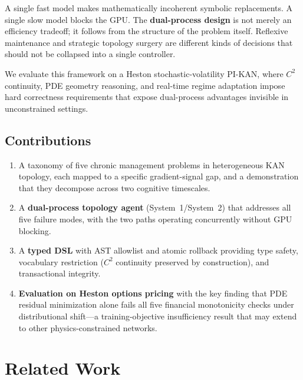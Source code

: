 \documentclass[11pt,a4paper]{article}
\begin{document}
A single fast model makes mathematically incoherent symbolic replacements. A single slow
model blocks the GPU. The \textbf{dual-process design} is not merely an efficiency
tradeoff; it follows from the structure of the problem itself. Reflexive maintenance and
strategic topology surgery are different kinds of decisions that should not be collapsed
into a single controller.

We evaluate this framework on a Heston stochastic-volatility PI-KAN, where $C^2$
continuity, PDE geometry reasoning, and real-time regime adaptation impose hard
correctness requirements that expose dual-process advantages invisible in unconstrained
settings.

\subsection{Contributions}

\begin{enumerate}[nosep]
  \item A taxonomy of five chronic management problems in heterogeneous KAN topology,
  each mapped to a specific gradient-signal gap, and a demonstration that they decompose
  across two cognitive timescales.

  \item A \textbf{dual-process topology agent} (System~1/System~2) that addresses all
  five failure modes, with the two paths operating concurrently without GPU blocking.

  \item A \textbf{typed DSL} with AST allowlist and atomic rollback providing type
  safety, vocabulary restriction ($C^2$ continuity preserved by construction), and
  transactional integrity.

  \item \textbf{Evaluation on Heston options pricing} with the key finding that PDE
  residual minimization alone fails all five financial monotonicity checks under
  distributional shift---a training-objective insufficiency result that may extend to
  other physics-constrained networks.
\end{enumerate}

\section{Related Work}
\label{sec:related}
\end{document}
